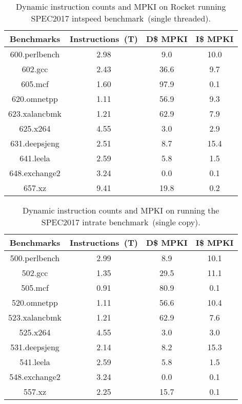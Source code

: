 \begin{table}[t]
\centering
    \begin{tabular}{|c|c|c|c|}
    \hline
        \textbf{Benchmarks} & \textbf{Instructions~(T)} & \textbf{D\$ MPKI} & \textbf{I\$ MPKI} \\
    \hline
        600.perlbench & 2.98 & 9.0 & 10.0 \\
        602.gcc & 2.43 & 36.6 & 9.7 \\
        605.mcf & 1.60 & 97.9 & 0.1 \\
        620.omnetpp & 1.11 & 56.9 & 9.3 \\
        623.xalancbmk & 1.21 & 62.9 & 7.9 \\
        625.x264 & 4.55 & 3.0 & 2.9 \\
        631.deepsjeng & 2.51 & 8.7 & 15.4 \\
        641.leela & 2.59 & 5.8 & 1.5 \\
        648.exchange2 & 3.24 & 0.0 & 0.1 \\
        657.xz & 9.41 & 19.8 & 0.2 \\
    \hline
    \end{tabular}
    \caption{Dynamic instruction counts and MPKI on Rocket running SPEC2017 intspeed benchmark~(single threaded).}
    \label{tbl:spec-intspeed}
\vspace{-0.1in}
\end{table}

\begin{table}[t]
\centering
    \begin{tabular}{|c|c|c|c|}
    \hline
        \textbf{Benchmarks} & \textbf{Instructions~(T)} & \textbf{D\$ MPKI} & \textbf{I\$ MPKI} \\
    \hline
        500.perlbench & 2.99 & 8.9 & 10.1 \\
        502.gcc & 1.35 & 29.5 & 11.1 \\
        505.mcf & 0.91 & 80.9 & 0.1 \\
        520.omnetpp & 1.11 & 56.6 & 10.4 \\
        523.xalancbmk & 1.21 & 62.9 & 7.6 \\
        525.x264 & 4.55 & 3.0 & 3.0 \\
        531.deepsjeng & 2.14 & 8.2 & 15.3 \\
        541.leela & 2.59 & 5.8 & 1.5 \\
        548.exchange2 & 3.24 & 0.0 & 0.1 \\
        557.xz & 2.25 & 15.7 & 0.1 \\
    \hline
    \end{tabular}
    \caption{Dynamic instruction counts and MPKI on running the SPEC2017 intrate benchmark~(single copy).}
    \label{tbl:spec-intrate}
\vspace{-0.1in}
\end{table}
